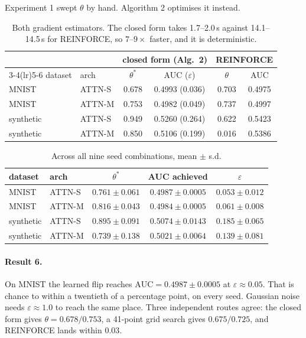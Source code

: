\documentclass[11pt,a4paper]{article}
\begin{document}
Experiment 1 swept $\theta$ by hand. Algorithm 2 optimises it instead.

\begin{table}[h]\centering\small
\begin{tabular}{llcccc}
\toprule
& & \multicolumn{2}{c}{closed form (Alg.\ 2)} & \multicolumn{2}{c}{REINFORCE}\\
\cmidrule(lr){3-4}\cmidrule(lr){5-6}
dataset & arch & $\theta^*$ & AUC ($\varepsilon$) & $\theta$ & AUC\\
\midrule
MNIST      & ATTN-S & 0.678 & 0.4993 (0.036) & 0.703 & 0.4975\\
MNIST      & ATTN-M & 0.753 & 0.4982 (0.049) & 0.737 & 0.4997\\
\addlinespace
synthetic  & ATTN-S & 0.949 & 0.5260 (0.264) & 0.622 & 0.5423\\
synthetic  & ATTN-M & 0.850 & 0.5106 (0.199) & 0.016 & 0.5386\\
\bottomrule
\end{tabular}
\caption{Both gradient estimators. The closed form takes 1.7--2.0\,s against
14.1--14.5\,s for REINFORCE, so $7$--$9\times$ faster, and it is
deterministic.}
\label{tab:e3}
\end{table}

\begin{table}[h]\centering\small
\begin{tabular}{llccc}
\toprule
dataset & arch & $\theta^*$ & AUC achieved & $\varepsilon$\\
\midrule
MNIST     & ATTN-S & $0.761\pm0.061$ & $\mathbf{0.4987\pm0.0005}$ & $0.053\pm0.012$\\
MNIST     & ATTN-M & $0.816\pm0.043$ & $\mathbf{0.4984\pm0.0005}$ & $0.061\pm0.008$\\
synthetic & ATTN-S & $0.895\pm0.091$ & $0.5074\pm0.0143$ & $0.185\pm0.065$\\
synthetic & ATTN-M & $0.739\pm0.138$ & $0.5021\pm0.0064$ & $0.139\pm0.081$\\
\bottomrule
\end{tabular}
\caption{Across all nine seed combinations, mean $\pm$ s.d.}
\label{tab:e3seeds}
\end{table}

\paragraph{Result 6.} On MNIST the learned flip reaches
$\mathrm{AUC}=0.4987\pm0.0005$ at $\varepsilon\approx0.05$. That is chance to
within a twentieth of a percentage point, on every seed. Gaussian noise needs
$\varepsilon\approx1.0$ to reach the same place. Three independent routes
agree: the closed form gives $\theta=0.678/0.753$, a 41-point grid search gives
$0.675/0.725$, and REINFORCE lands within $0.03$.
\end{document}
